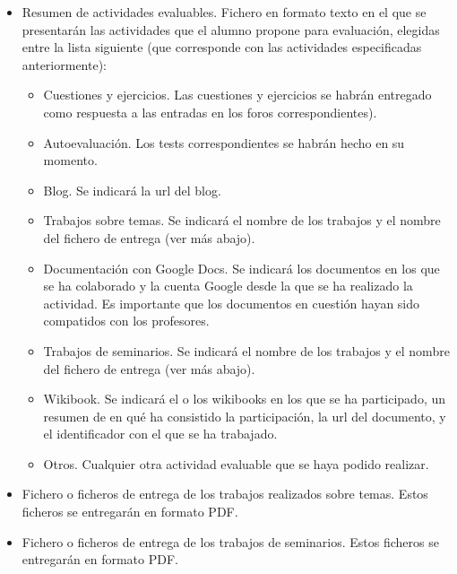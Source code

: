 \documentclass[a4paper,12pt]{article}
\begin{document}
\begin{itemize}
\item Resumen de actividades evaluables. Fichero en formato texto en el que se presentarán las actividades que el alumno propone para evaluación, elegidas entre la lista siguiente (que corresponde con las actividades especificadas anteriormente):
  \begin{itemize}
  \item Cuestiones y ejercicios. Las cuestiones y ejercicios se habrán entregado como respuesta a las entradas en los foros correspondientes).
  \item Autoevaluación. Los tests correspondientes se habrán hecho en su momento.
  \item Blog. Se indicará la url del blog.
  \item Trabajos sobre temas. Se indicará el nombre de los trabajos y el nombre del fichero de entrega (ver más abajo).
  \item Documentación con Google Docs. Se indicará los documentos en los que se ha colaborado y la cuenta Google desde la que se ha realizado la actividad. Es importante que los documentos en cuestión hayan sido compatidos con los profesores.
  \item Trabajos de seminarios. Se indicará el nombre de los trabajos y el nombre del fichero de entrega (ver más abajo).
  \item Wikibook. Se indicará el o los wikibooks en los que se ha participado, un resumen de en qué ha consistido la participación, la url del documento, y el identificador con el que se ha trabajado.
  \item Otros. Cualquier otra actividad evaluable que se haya podido realizar.
  \end{itemize}
\item Fichero o ficheros de entrega de los trabajos realizados sobre temas. Estos ficheros se entregarán en formato PDF.
\item Fichero o ficheros de entrega de los trabajos de seminarios. Estos ficheros se entregarán en formato PDF.
\end{itemize}
\end{document}
